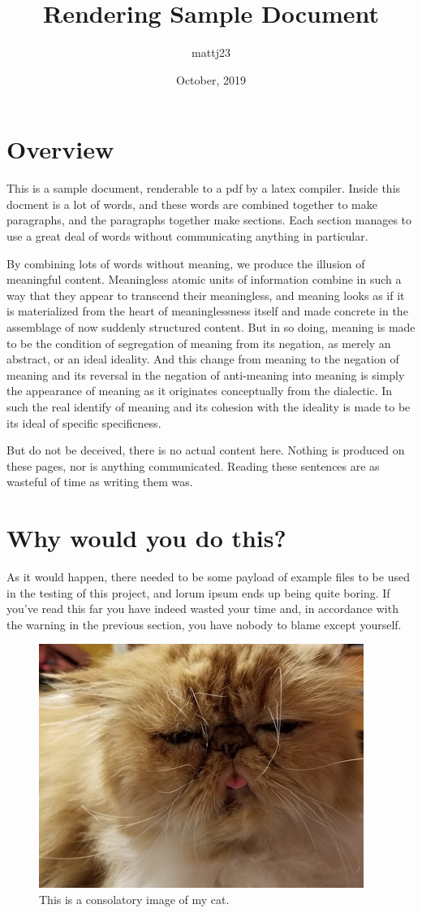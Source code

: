 \documentclass{article}
\title{Rendering Sample Document}
\author{mattj23}
\date{October, 2019}
\begin{document}
\maketitle

\section{Overview}
This is a sample document, renderable to a pdf by a latex compiler. Inside this docment is a lot of words, and these words are combined together to make paragraphs, and the paragraphs together make sections. Each section manages to use a great deal of words without communicating anything in particular.

By combining lots of words without meaning, we produce the illusion of meaningful content. Meaningless atomic units of information combine in such a way that they appear to transcend their meaningless, and meaning looks as if it is materialized from the heart of meaninglessness itself and made concrete in the assemblage of now suddenly structured content.  But in so doing, meaning is made to be the condition of segregation of meaning from its negation, as merely an abstract, or an ideal ideality.  And this change from meaning to the negation of meaning and its reversal in the negation of anti-meaning into meaning is simply the appearance of meaning as it originates conceptually from the dialectic.  In such the real identify of meaning and its cohesion with the ideality is made to be its ideal of specific specificness.

But do not be deceived, there is no actual content here. Nothing is produced on these pages, nor is anything communicated. Reading these sentences are as wasteful of time as writing them was.

\section{Why would you do this?}
As it would happen, there needed to be some payload of example files to be used in the testing of this project, and lorum ipsum ends up being quite boring.  If you've read this far you have indeed wasted your time and, in accordance with the warning in the previous section, you have nobody to blame except yourself.


\begin{figure}[h!]
\centering
\includegraphics[scale=1.7]{cat}
\caption{This is a consolatory image of my cat.}
\label{fig:cat}
\end{figure}
\end{document}
